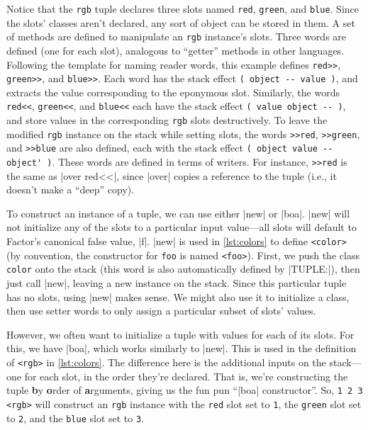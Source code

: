 Notice that the \Verb|rgb| tuple declares three slots named \Verb|red|,
\Verb|green|, and \Verb|blue|.  Since the slots' classes aren't declared,
any sort of object can be stored in them.  A set of methods are defined to
manipulate an \Verb|rgb| instance's slots.  Three  words are
defined (one for each slot), analogous to ``getter'' methods in other
languages.  Following the template for naming reader words, this example
defines \Verb|red>>|, \Verb|green>>|, and \Verb|blue>>|.  Each word has
the stack effect
%
\Verb|( object -- value )|,
%
and extracts the value corresponding to the eponymous slot.  Similarly, the
 words \Verb|red<<|, \Verb|green<<|, and \Verb|blue<<| each
have the stack effect
%
\Verb|( value object -- )|,
%
and store values in the corresponding \Verb|rgb| slots destructively.  To
leave the modified \Verb|rgb| instance on the stack while setting slots, the
 words \Verb|>>red|, \Verb|>>green|, and \Verb|>>blue| are
also defined, each with the stack effect
%
\Verb|( object value -- object' )|.
%
These words are defined in terms of writers.  For instance, \Verb|>>red| is
the same as \factor|over red<<|, since \factor|over| copies a reference to the
tuple (i.e., it doesn't make a ``deep'' copy).

To construct an instance of a tuple, we can use either \factor|new| or
\factor|boa|.  \factor|new| will not initialize any of the slots to a
particular input value---all slots will default to Factor's canonical false
value, \factor|f|.  \factor|new| is used in \cref{lst:colors} to define
\Verb|<color>| (by convention, the constructor for \Verb|foo| is named
\Verb|<foo>|).  First, we push the class \Verb|color| onto the stack (this
word is also automatically defined by \factor|TUPLE:|), then just call
\factor|new|, leaving a new instance on the stack.  Since this particular tuple
has no slots, using \factor|new| makes sense.  We might also use it to
initialize a class, then use setter words to only assign a particular subset of
slots' values.

However, we often want to initialize a tuple with values for each of its slots.
For this, we have \factor|boa|, which works similarly to \factor|new|.  This is
used in the definition of \Verb|<rgb>| in \cref{lst:colors}.  The difference
here is the additional inputs on the stack---one for each slot, in the order
they're declared.  That is, we're constructing the tuple \textbf{b}y
\textbf{o}rder of \textbf{a}rguments, giving us the fun pun ``\factor|boa|
constructor''.  So, \Verb|1 2 3 <rgb>| will construct an \Verb|rgb|
instance with the \Verb|red| slot set to \Verb|1|, the \Verb|green| slot
set to \Verb|2|, and the \Verb|blue| slot set to \Verb|3|.

